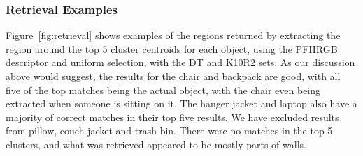 \documentclass[11pt,a4paper]{kth-mag}
\begin{document}
\subsubsection{Retrieval Examples}
Figure~\ref{fig:retrieval} shows examples of the regions returned by extracting
the region around the top 5 cluster centroids for each object, using the PFHRGB
descriptor and uniform selection, with the DT and K10R2 sets. As our discussion
above would suggest, the results for the chair and backpack are good, with all
five of the top matches being the actual object, with the chair even being
extracted when someone is sitting on it. The hanger jacket and laptop also have
a majority of correct matches in their top five results. We have excluded
results from pillow, couch jacket and trash bin. There were no matches in the
top 5 clusters, and what was retrieved appeared to be mostly parts of walls.
\end{document}
